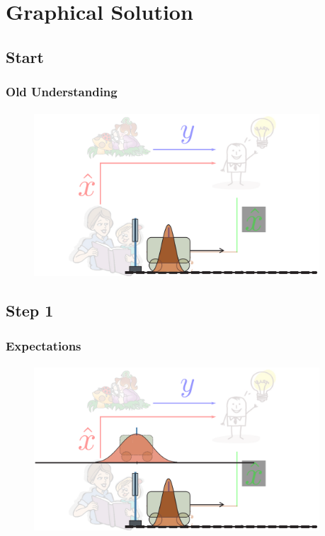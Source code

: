 \section{Graphical Solution}
\subsection{Start}
\begin{frame}\pw\Large
\frametitle{Old Understanding}
\framesubtitle{}
\begin{figure}
\includegraphics[width=0.95\textwidth]{figs/WFAR11_UCP_Update_Prediction_Process-0.pdf}
\end{figure}
\end{frame}



\subsection{Step 1}
\begin{frame}\pw\Large
\frametitle{Expectations}
\framesubtitle{}
\begin{figure}
\includegraphics[width=0.95\textwidth]{figs/WFAR11_UCP_Update_Prediction_Process-1.pdf}
\end{figure}
\end{frame}


